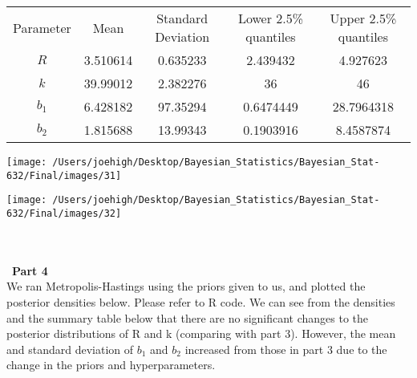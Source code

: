 \documentclass[10pt,a4paper]{article}
\begin{document}
\begin{center}
  \begin{tabular}{ |c|c|c|c|c| }
  \hline
  Parameter & Mean & Standard Deviation & Lower 2.5\% quantiles & Upper 2.5\% quantiles  \\ 
  $R$ & 3.510614 & 0.635233 & 2.439432 & 4.927623 \\
  $k$ & 39.99012 & 2.382276 & 36 & 46 \\
  $b_1$ & 6.428182 &  97.35294 &  0.6474449 & 28.7964318  \\
  $b_2$ &  1.815688 & 13.99343 & 0.1903916 & 8.4587874 \\
  \hline
  \end{tabular}
  \end{center}
  
\centerline{\texttt{[image: /Users/joehigh/Desktop/Bayesian\_Statistics/Bayesian\_Stat-632/Final/images/31]}}
\centerline{\texttt{[image: /Users/joehigh/Desktop/Bayesian\_Statistics/Bayesian\_Stat-632/Final/images/32]}}
\text{}\\
\\\
\textbf{Part 4} \\
We ran Metropolis-Hastings using the priors given to us, and plotted the posterior densities below. Please refer to R code. We can see from the densities and the summary table below that there are no significant changes to the posterior distributions of R and k (comparing with part 3). However, the mean and standard deviation of $b_1$ and $b_2$ increased from those in part 3 due to the change in the priors and hyperparameters. 
\end{document}
